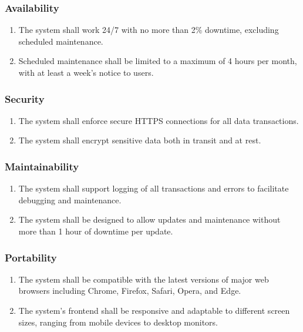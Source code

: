 \subsubsection{Availability}
\begin{enumerate}[resume]
    \item The system shall work 24/7 with no more than 2\% downtime, excluding scheduled maintenance.
    \item Scheduled maintenance shall be limited to a maximum of 4 hours per month, with at least a week's notice to users.
\end{enumerate}

\subsubsection{Security}
\begin{enumerate}[resume]
    \item The system shall enforce secure HTTPS connections for all data transactions.
    \item The system shall encrypt sensitive data both in transit and at rest.
\end{enumerate}

\subsubsection{Maintainability}
\begin{enumerate}[resume]
    \item The system shall support logging of all transactions and errors to facilitate debugging and maintenance.
    \item The system shall be designed to allow updates and maintenance without more than 1 hour of downtime per update.
\end{enumerate}

\subsubsection{Portability}
\begin{enumerate}[resume]
    \item The system shall be compatible with the latest versions of major web browsers including Chrome, Firefox, Safari, Opera, and Edge.
    \item The system's frontend shall be responsive and adaptable to different screen sizes, ranging from mobile devices to desktop monitors.
\end{enumerate}



